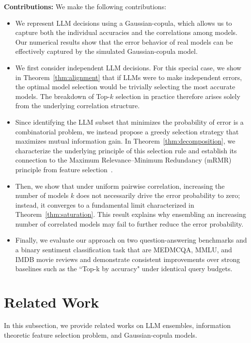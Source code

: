 \documentclass{article}
\theoremstyle{plain}
\theoremstyle{definition}
\theoremstyle{remark}
\begin{document}
\noindent\textbf{Contributions:} We make the following contributions:
\begin{itemize}%
    \item We represent LLM decisions using a Gaussian-copula, which allows us to capture both the individual accuracies and the correlations among models. Our numerical results show that the error behavior of real models can be effectively captured by the simulated Gaussian-copula model. 
    \item We first consider independent LLM decisions. For this special case, we show in Theorem~\ref{thm:alignment} that if LLMs were to make independent errors, the optimal model selection would be trivially selecting the most accurate models. The breakdown of Top-$k$ selection in practice therefore arises solely from the underlying correlation structure.
    \item Since identifying the LLM subset that minimizes the probability of error is a combinatorial problem, we instead propose a greedy selection strategy that maximizes mutual information gain. In Theorem~\ref{thm:decomposition}, we characterize the underlying principle of this selection rule and establish its connection to the Maximum Relevance–Minimum Redundancy (mRMR) principle from feature selection~\citep{peng2005}.
    \item Then, we show that under uniform pairwise correlation, increasing the number of models $k$ does not necessarily drive the error probability to zero; instead, it converges to a fundamental limit characterized in Theorem~\ref{thm:saturation}. This result explains why ensembling an increasing number of correlated models may fail to further reduce the error probability.
    \item Finally, we evaluate our approach on two question-answering benchmarks and a binary sentiment classification task that are MEDMCQA, MMLU, and IMDB movie reviews and demonstrate consistent improvements over strong baselines such as the ``Top-k by accuracy" under identical query budgets.
\end{itemize}

\section{Related Work}
In this subsection, we provide related works on LLM ensembles, information theoretic feature selection problem, and Gaussian-copula models. 
\end{document}
